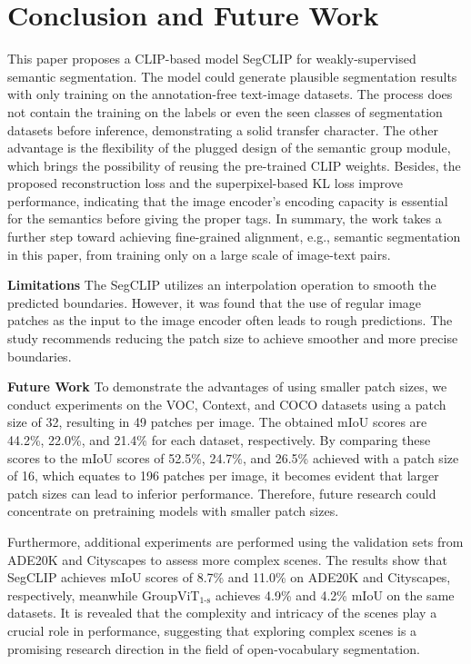 \documentclass{article}
\theoremstyle{plain}
\theoremstyle{definition}
\theoremstyle{remark}
\begin{document}
\section{Conclusion and Future Work}
\label{sec_conclusion}
This paper proposes a CLIP-based model SegCLIP for weakly-supervised semantic segmentation. The model could generate plausible segmentation results with only training on the annotation-free text-image datasets. The process does not contain the training on the labels or even the seen classes of segmentation datasets before inference, demonstrating a solid transfer character. The other advantage is the flexibility of the plugged design of the semantic group module, which brings the possibility of reusing the pre-trained CLIP weights. Besides, the proposed reconstruction loss and the superpixel-based KL loss improve performance, indicating that the image encoder's encoding capacity is essential for the semantics before giving the proper tags. In summary, the work takes a further step toward achieving fine-grained alignment, e.g., semantic segmentation in this paper, from training only on a large scale of image-text pairs.

\vspace{0.1cm}
\noindent
\textbf{Limitations} \quad The SegCLIP utilizes an interpolation operation to smooth the predicted boundaries. However, it was found that the use of regular image patches as the input to the image encoder often leads to rough predictions. The study recommends reducing the patch size to achieve smoother and more precise boundaries. 

\vspace{0.1cm}
\noindent
\textbf{Future Work} \quad To demonstrate the advantages of using smaller patch sizes, we conduct experiments on the VOC, Context, and COCO datasets using a patch size of 32, resulting in 49 patches per image. The obtained mIoU scores are 44.2\%, 22.0\%, and 21.4\% for each dataset, respectively. By comparing these scores to the mIoU scores of 52.5\%, 24.7\%, and 26.5\% achieved with a patch size of 16, which equates to 196 patches per image, it becomes evident that larger patch sizes can lead to inferior performance. Therefore, future research could concentrate on pretraining models with smaller patch sizes. 

Furthermore, additional experiments are performed using the validation sets from ADE20K \cite{Zhou2017scene} and Cityscapes \cite{Cordts2016cityscapes} to assess more complex scenes. The results show that SegCLIP achieves mIoU scores of 8.7\% and 11.0\% on ADE20K and Cityscapes, respectively, meanwhile GroupViT$_{\text{1-s}}$ achieves 4.9\% and 4.2\% mIoU on the same datasets. It is revealed that the complexity and intricacy of the scenes play a crucial role in performance, suggesting that exploring complex scenes is a promising research direction in the field of open-vocabulary segmentation.
\end{document}

